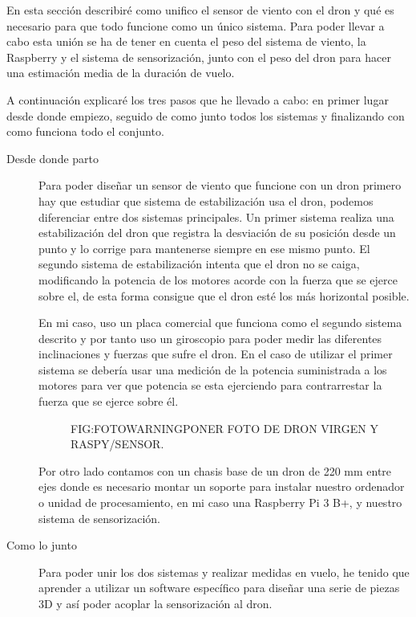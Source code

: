 
En esta sección describiré como unifico el sensor de viento con el dron y qué es necesario para que todo funcione como un único sistema.
Para poder llevar a cabo esta unión se ha de tener en cuenta el peso del sistema de viento, la Raspberry y el sistema de sensorización, junto con el peso del dron para hacer una estimación media de la duración de vuelo.

A continuación explicaré los tres pasos que he llevado a cabo: en primer lugar desde donde empiezo, seguido de como junto todos los sistemas y finalizando con como funciona todo el conjunto.

\begin{description}
\item[Desde donde parto]
Para poder diseñar un sensor de viento que funcione con un dron primero hay que estudiar que sistema de estabilización usa el dron, podemos diferenciar entre dos sistemas principales. Un primer sistema realiza una estabilización del dron que registra la desviación de su posición desde un punto y lo corrige para mantenerse siempre en ese mismo punto. El segundo sistema de estabilización intenta que el dron no se caiga, modificando la potencia de los motores acorde con la fuerza que se ejerce sobre el, de esta forma consigue que el dron esté los más horizontal posible.

En mi caso, uso un placa comercial que funciona como el segundo sistema descrito y por tanto uso un giroscopio para poder medir las diferentes inclinaciones y fuerzas que sufre el dron. En el caso de utilizar el primer sistema se debería usar una medición de la potencia suministrada a los motores para ver que potencia se esta ejerciendo para contrarrestar la fuerza que se ejerce sobre él.

  \begin{figure}[Dron con y sin piezas añadidas]{FIG:FOTOWARNING}{PONER FOTO DE DRON VIRGEN Y RASPY/SENSOR.}
\end{figure}

Por otro lado contamos con un chasis base de un dron de 220 mm entre ejes donde es necesario montar un soporte para instalar nuestro ordenador o unidad de procesamiento, en mi caso una Raspberry Pi 3 B+, y nuestro sistema de sensorización.

\item[Como lo junto]
Para poder unir los dos sistemas y realizar medidas en vuelo, he tenido que aprender a utilizar un software específico para diseñar una serie de piezas 3D y así poder acoplar la sensorización al dron.


\end{description}
